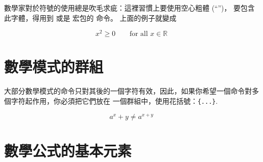 數學家對於符號的使用總是吹毛求疵：這裡習慣上要使用空心粗體 (``'')，
要包含此字體，得用到  或是  宏包的  命令。\ifx\mathbb\undefined\else
上面的例子就變成

\begin{example}
\begin{displaymath}
x^{2} \geq 0\qquad
\textrm{for all }x\in\mathbb{R}
\end{displaymath}
\end{example}
\fi

\section{數學模式的群組}

大部分數學模式的命令只對其後的一個字符有效，因此，如果你希望一個命令對多個字符起作用，你必須把它們放在
一個群組中，使用花括號：\verb|{...}|.
\begin{example}
\begin{equation}
a^x+y \neq a^{x+y}
\end{equation}
\end{example}

\section{數學公式的基本元素}
%

